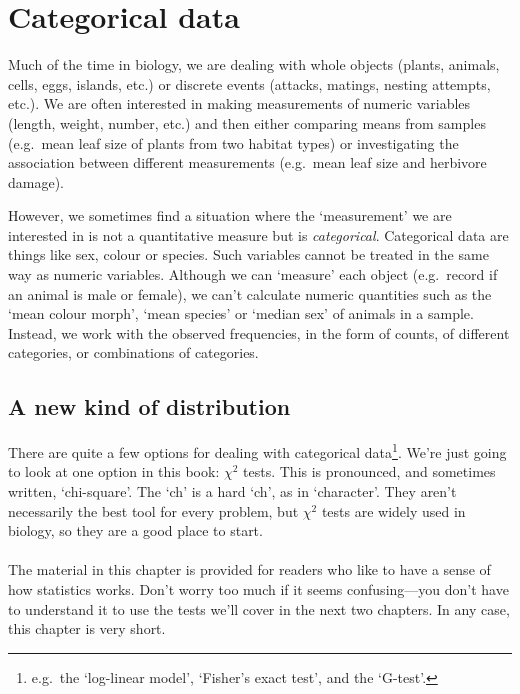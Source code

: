 \documentclass[
]{book}
\newenvironment{greybox}{
  \definecolor{shadecolor}{rgb}{0.95,0.95,0.95}  %
  \color{black}
  \begin{shaded}}
 {\end{shaded}}
\newenvironment{infobox}[1]
  {
  \begin{itemize}
  \renewcommand{\labelitemi}{
    \raisebox{-.7\height}[0pt][0pt]{
      {\setkeys{Gin}{width=3em,keepaspectratio}
        \texttt{[image: images/\#1]}}
    }
  }
  \setlength{\fboxsep}{1em}
  \begin{greybox}
  \item
  }
  {
  \end{greybox}
  \end{itemize}
  }
\begin{document}
\hypertarget{categorical-data-intro-chapter}{%
\chapter{Categorical data}\label{categorical-data-intro-chapter}}

Much of the time in biology, we are dealing with whole objects (plants, animals, cells, eggs, islands, etc.) or discrete events (attacks, matings, nesting attempts, etc.). We are often interested in making measurements of numeric variables (length, weight, number, etc.) and then either comparing means from samples (e.g.~mean leaf size of plants from two habitat types) or investigating the association between different measurements (e.g.~mean leaf size and herbivore damage).

However, we sometimes find a situation where the `measurement' we are interested in is not a quantitative measure but is \emph{categorical}. Categorical data are things like sex, colour or species. Such variables cannot be treated in the same way as numeric variables. Although we can `measure' each object (e.g.~record if an animal is male or female), we can't calculate numeric quantities such as the `mean colour morph', `mean species' or `median sex' of animals in a sample. Instead, we work with the observed frequencies, in the form of counts, of different categories, or combinations of categories.

\hypertarget{a-new-kind-of-distribution}{%
\section{A new kind of distribution}\label{a-new-kind-of-distribution}}

There are quite a few options for dealing with categorical data\footnote{e.g.~the `log-linear model', `Fisher's exact test', and the `G-test'.}. We're just going to look at one option in this book: \(\chi^2\) tests. This is pronounced, and sometimes written, `chi-square'. The `ch' is a hard `ch', as in `character'. They aren't necessarily the best tool for every problem, but \(\chi^2\) tests are widely used in biology, so they are a good place to start.

\begin{infobox}{warning}

\hypertarget{section-16}{%
\subsubsection*{}\label{section-16}}

The material in this chapter is provided for readers who like to have a sense of how statistics works. Don't worry too much if it seems confusing---you don't have to understand it to use the tests we'll cover in the next two chapters. In any case, this chapter is very short.

\end{infobox}
\end{document}
